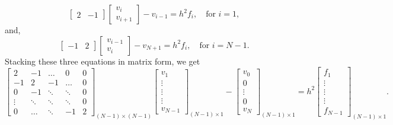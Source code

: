 \documentclass[english,notitlepage]{revtex4}  %
\begin{document}
\begin{equation*}
    \begin{bmatrix}
    2 & -1
    \end{bmatrix} 
    \begin{bmatrix}
        v_{i}\\v_{i+1}
    \end{bmatrix} - v_{i-1}
    = h^2 f_i, \quad\text{for $i=1$},
\end{equation*}
and,
\begin{equation*}
    \begin{bmatrix}
    -1 & 2
    \end{bmatrix} 
    \begin{bmatrix}
        v_{i-1}\\v_{i}
    \end{bmatrix} - v_{N+1}
    = h^2 f_i, \quad\text{for $i=N-1$}.
\end{equation*}
Stacking these three equations in matrix form, we get
\begin{equation*}
    \begin{bmatrix}
    2   & -1 & \dots & 0 & 0 \\
    -1  & 2 & -1    & \dots & 0 \\
    0   & -1 &\ddots&\ddots&0\\
    \vdots& \ddots & \ddots & \ddots & 0\\
    0 & \dots& \ddots &  -1 & 2
    \end{bmatrix}_{(N-1)\times(N-1)}
    \begin{bmatrix}
        v_{1}\\\vdots\\\vdots\\\vdots\\v_{N-1}
    \end{bmatrix}_{(N-1)\times 1} 
    - 
    \begin{bmatrix}
        v_{0}\\0\\\vdots\\0 \\v_{N}
    \end{bmatrix}_{(N-1)\times 1}
    = h^2    
    \begin{bmatrix}
        f_{1}\\ \vdots\\\vdots\\\vdots \\f_{N-1}
    \end{bmatrix}_{(N-1)\times 1}.
\end{equation*}
\end{document}
